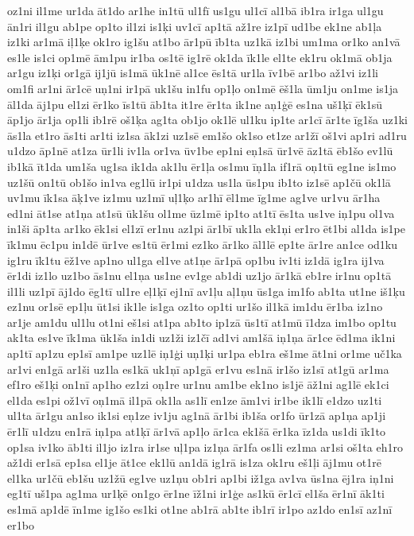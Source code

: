 {oz1ni
il1me
ur1da
āt1do
ar1he
in1tū
ul1fī
us1gu
ul1cī
al1bā
ib1ra
ir1ga
ul1gu
ān1ri
il1gu
ab1pe
op1to
il1zi
is1ķi
uv1cī
ap1tā
až1re
iz1pī
ud1be
ek1ne
ab1ļa
iz1ki
ar1mā
iļ1ķe
ok1ro
ig1šu
at1bo
ār1pū
īb1ta
uz1kā
iz1bi
um1ma
or1ko
an1vā
es1le
is1ci
op1mē
ām1pu
ir1ba
os1tē
ig1rē
ok1da
īk1le
el1te
ek1ru
ok1mā
ob1ja
ar1gu
iz1ķi
or1gā
ij1jū
is1mā
ūk1nē
al1ce
ēs1tā
ur1la
īv1bē
ar1bo
až1vi
iz1li
om1fi
ar1ni
ār1cē
uņ1ni
ir1pā
uk1šu
in1fu
op1ļo
on1mē
ēš1la
ūm1ju
on1me
is1ja
āl1da
āj1pu
el1zi
ēr1ko
īs1tū
āb1ta
it1re
ēr1ta
ik1ne
aņ1ģē
es1na
uš1ķī
ēk1sū
āp1jo
ār1ja
op1li
ib1rē
oš1ķa
ag1ta
ob1jo
ok1lē
ul1ku
ip1te
ar1cī
ār1te
īg1ša
uz1ki
ās1la
et1ro
ās1ti
ar1ti
iz1sa
āk1zi
uz1sē
em1šo
ok1so
et1ze
ar1žī
oš1vi
ap1ri
ad1ru
u1dzo
āp1nē
at1za
ūr1li
iv1la
or1va
ūv1be
ep1ni
eņ1sā
ūr1vē
āz1tā
ēb1šo
ev1lū
ib1kā
īt1da
um1ša
ug1sa
ik1da
ak1lu
ēr1ļa
os1mu
īņ1la
if1rā
oņ1tū
eg1ne
is1mo
uz1šū
on1tū
ob1šo
in1va
eg1lū
ir1pi
u1dza
us1la
ūs1pu
ib1to
iz1sē
ap1čū
ok1lā
uv1mu
īk1sa
āķ1ve
iz1mu
uz1mī
uļ1ķo
ar1hī
ēl1me
īg1me
ag1ve
ur1vu
ār1ha
ed1ni
āt1se
at1ņa
at1sū
ūk1šu
ol1me
ūz1mē
ip1to
at1tī
ēs1ta
us1ve
iņ1pu
ol1va
in1ši
āp1ta
ar1ko
ēk1si
el1zī
er1nu
az1pi
ār1bī
uk1la
ek1ņi
er1ro
ēt1bi
al1da
is1pe
īk1mu
ēc1pu
in1dē
ūr1ve
es1tū
ēr1mi
ez1ko
ār1ko
āl1lē
ep1te
ār1re
an1ce
od1ku
ig1ru
īk1tu
ēž1ve
ap1no
ul1ga
el1ve
at1ņe
ār1pā
op1bu
iv1ti
iz1dā
ig1ra
ij1va
ēr1di
iz1lo
uz1bo
ās1nu
el1ņa
us1ne
ev1ge
ab1di
uz1jo
ār1kā
eb1re
ir1nu
op1tā
il1li
uz1pī
āj1do
ēg1tī
ul1re
eļ1ķī
ej1nī
av1ļu
aļ1ņu
ūs1ga
im1fo
ab1ta
ut1ne
iš1ķu
ez1nu
or1sē
ep1ļu
ūt1si
ik1le
is1ga
oz1to
op1ti
ur1šo
il1kā
im1du
ēr1ba
iz1no
ar1je
am1du
ul1lu
ot1ni
eš1si
at1pa
ab1to
ip1zā
ūs1tī
at1mū
ī1dza
im1bo
op1tu
ak1ta
es1ve
īk1ma
ūk1ša
in1di
uz1ži
iz1čī
ad1vi
am1šā
iņ1ņa
ār1ce
ēd1ma
ik1ni
ap1tī
ap1zu
ep1sī
am1pe
uz1lē
iņ1ģi
uņ1ķi
ur1pa
eb1ra
eš1me
āt1ni
or1me
uč1ka
ar1vi
en1gā
ar1ši
uz1la
es1kā
uk1ņī
ap1gā
er1vu
es1nā
ir1šo
iz1sī
at1gū
ar1ma
ef1ro
eš1ķi
on1nī
ap1ho
ez1zi
oņ1re
ur1nu
am1be
ek1no
is1jē
āž1ni
ag1lē
ek1ci
el1da
es1pi
ož1vī
oņ1mā
il1pā
ok1la
as1lī
en1ze
ām1vi
ir1be
ik1lī
e1dzo
uz1ti
ul1ta
ār1gu
an1so
ik1si
eņ1ze
iv1ju
ag1nā
ār1bi
ib1ša
or1fo
ūr1zā
ap1ņa
ap1ji
ēr1lī
u1dzu
en1rā
iņ1pa
at1ķī
ār1vā
ap1ļo
ār1ca
ek1šā
ēr1ka
īz1da
us1di
īk1to
op1sa
iv1ko
āb1ti
il1jo
iz1ra
ir1se
uļ1pa
iz1ņa
ār1fa
os1li
ez1ma
ar1si
oš1ta
eh1ro
až1di
er1sā
ep1sa
el1je
āt1ce
ek1lū
an1dā
ig1rā
is1za
ok1ru
eš1ļi
āj1mu
ot1rē
el1ka
ur1čū
eb1šu
uz1žū
eg1ve
uz1ņu
ob1ri
ap1bi
iž1ga
av1va
ūs1na
ēj1ra
iņ1ni
eg1tī
uš1pa
ag1ma
ur1ķē
on1go
ēr1ne
īž1ni
ir1ģe
as1kū
ēr1cī
el1ša
ēr1nī
āk1ti
es1mā
ap1dē
īn1me
ig1šo
es1ki
ot1ne
ab1rā
ab1te
ib1rī
ir1po
az1do
en1sī
az1nī
er1bo
}
